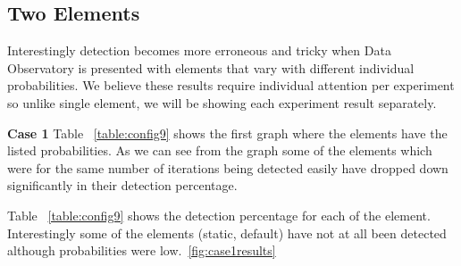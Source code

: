 \documentclass[fleqn,12pt]{SelfArx} %
\begin{document}
\subsection{Two Elements}
Interestingly detection becomes more erroneous and tricky when Data Observatory is presented with elements that vary with different individual probabilities. We believe these results require individual attention per experiment so unlike single element, we will be showing each experiment result separately.\par

\textbf{Case 1} Table ~\ref{table:config9} shows the first graph where the elements have the listed probabilities. As we can see from the graph some of the elements which were for the same number of iterations being detected easily have dropped down significantly in their detection percentage. 
\par Table ~\ref{table:config9} shows the detection percentage for each of the element. Interestingly some of the elements (static, default) have not at all been detected although probabilities were low.~\ref{fig:case1results}
\end{document}
